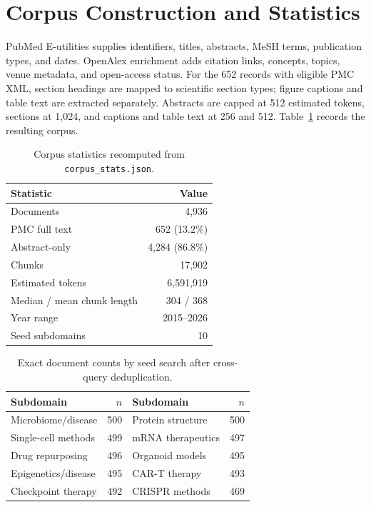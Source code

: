 \documentclass{article}
\begin{document}



\newpage
\appendix

\section{Corpus Construction and Statistics}
\label{app:corpus}

PubMed E-utilities supplies identifiers, titles, abstracts, MeSH terms, publication types, and dates. OpenAlex enrichment adds citation links, concepts, topics, venue metadata, and open-access status. For the 652 records with eligible PMC XML, section headings are mapped to scientific section types; figure captions and table text are extracted separately. Abstracts are capped at 512 estimated tokens, sections at 1,024, and captions and table text at 256 and 512. Table~\ref{tab:corpusstats} records the resulting corpus.

\begin{table}[h]
\centering
\caption{Corpus statistics recomputed from \texttt{corpus\_stats.json}.}
\label{tab:corpusstats}
\small
\begin{tabular}{lr}
\toprule
Statistic & Value \\
\midrule
Documents & 4,936 \\
PMC full text & 652 (13.2\%) \\
Abstract-only & 4,284 (86.8\%) \\
Chunks & 17,902 \\
Estimated tokens & 6,591,919 \\
Median / mean chunk length & 304 / 368 \\
Year range & 2015--2026 \\
Seed subdomains & 10 \\
\bottomrule
\end{tabular}
\end{table}

\begin{table}[h]
\centering
\caption{Exact document counts by seed search after cross-query deduplication.}
\label{tab:subdomains}
\small
\begin{tabular}{lr@{\qquad}lr}
\toprule
Subdomain & $n$ & Subdomain & $n$ \\
\midrule
Microbiome/disease & 500 & Protein structure & 500 \\
Single-cell methods & 499 & mRNA therapeutics & 497 \\
Drug repurposing & 496 & Organoid models & 495 \\
Epigenetics/disease & 495 & CAR-T therapy & 493 \\
Checkpoint therapy & 492 & CRISPR methods & 469 \\
\bottomrule
\end{tabular}
\end{table}
\end{document}
